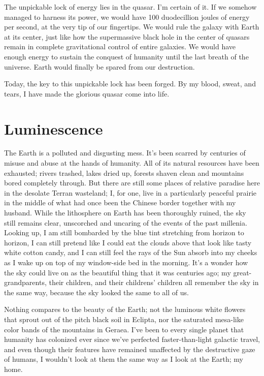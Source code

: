 \documentclass{book}
\begin{document}
			The unpickable lock of energy lies in the quasar. I'm certain of it. If we somehow managed to
			harness its power, we would have 100 duodecillion joules of energy per second, at the very tip of
			our fingertips. We would rule the galaxy with Earth at its center, just like how the
			supermassive black hole in the center of quasars remain in complete gravitational control
			of entire galaxies. We would have enough energy to sustain the conquest of humanity until the
			last breath of the universe. Earth would finally be spared from our destruction.

			Today, the key to this unpickable lock has been forged. By my blood, sweat, and tears,
			I have made the glorious quasar come into life.



		\chapter{Luminescence}
			The Earth is a polluted and disgusting mess. It's been scarred by centuries of misuse
			and abuse at the hands of humanity. All of its natural resources have been exhausted;
			rivers trashed, lakes dried up, forests shaven clean and mountains bored completely
			through. But there are still some places of relative paradise here in the desolate
			Terran wasteland; I, for one, live in a particularly peaceful prairie in the middle of
			what had once been the Chinese border together with my husband. While the
			lithosphere on Earth has been thoroughly ruined, the sky still remains clear,
			unscorched and uncaring of the events of the past millenia. Looking up, I am still
			bombarded by the blue tint stretching from horizon to horizon, I can still pretend like
			I could eat the clouds above that look like tasty white cotton candy, and I can still
			feel the rays of the Sun absorb into my cheeks as I wake up on top of my window-side bed in the
			morning. It's a wonder how the sky could live on as the beautiful thing that it was
			centuries ago; my great-grandparents, their children, and their childrens' children all
			remember the sky in the same way, because the sky looked the same to all of us.

			Nothing compares to the beauty of the Earth; not the luminous white flowers that sprout
			out of the pitch black soil in Eclipta, nor the saturated mesa-like color bands of the
			mountains in Geraea. I've been to every single planet that humanity has colonized ever
			since we've perfected faster-than-light galactic travel, and even though their features
			have remained unaffected by the destructive gaze of humans, I wouldn't look at them the
			same way as I look at the Earth; my home.
\end{document}
